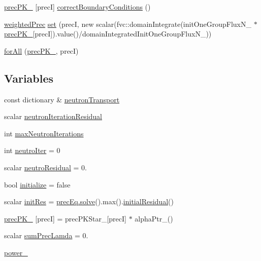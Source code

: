 \begin{DoxyCompactItemize}
\item 
\hyperlink{solvePointKineticsLiquidFuel_8H_a4fbb9f930fffeb8b5c6f88d6d76407f8}{prec\+P\+K\+\_\+} \mbox{[}precI\mbox{]} \hyperlink{solvePointKineticsLiquidFuel_8H_afa9c32a1343c6757096c085e4e03779d}{correct\+Boundary\+Conditions} ()
\item 
\hyperlink{solvePointKineticsLiquidFuel_8H_a056af3c483d96d8b3afe03e52ad0ed8b}{weighted\+Prec} \hyperlink{solvePointKineticsLiquidFuel_8H_ad5aac0954594169676a922d4bd3dbf07}{set} (precI, new scalar(fvc\+::domain\+Integrate(init\+One\+Group\+Flux\+N\+\_\+ $\ast$\hyperlink{solvePointKineticsLiquidFuel_8H_a4fbb9f930fffeb8b5c6f88d6d76407f8}{prec\+P\+K\+\_\+}\mbox{[}precI\mbox{]}).value()/domain\+Integrated\+Init\+One\+Group\+Flux\+N\+\_\+))
\item 
\hyperlink{solvePointKineticsLiquidFuel_8H_a71ece860e941703d6353746b23d10e24}{for\+All} (\hyperlink{solvePointKineticsLiquidFuel_8H_a4fbb9f930fffeb8b5c6f88d6d76407f8}{prec\+P\+K\+\_\+}, precI)
\end{DoxyCompactItemize}
\subsection*{Variables}
\begin{DoxyCompactItemize}
\item 
const dictionary \& \hyperlink{solvePointKineticsLiquidFuel_8H_ac82f3800c6fe7f00c65fbf04d3c1050d}{neutron\+Transport}
\item 
scalar \hyperlink{solvePointKineticsLiquidFuel_8H_a868e32a0d29170b5c556eabe69917730}{neutron\+Iteration\+Residual}
\item 
int \hyperlink{solvePointKineticsLiquidFuel_8H_aeeb27a033c3d21cdfe4cc47565bc21a2}{max\+Neutron\+Iterations}
\item 
int \hyperlink{solvePointKineticsLiquidFuel_8H_aaccb2b7dfd16dab02e52710265a05476}{neutro\+Iter} = 0
\item 
scalar \hyperlink{solvePointKineticsLiquidFuel_8H_aaf0ed550d3d8825b71bbeef77fd0387b}{neutro\+Residual} = 0.
\item 
bool \hyperlink{solvePointKineticsLiquidFuel_8H_a51d89a8c672e71d2091a843cdba679e6}{initialize} = false
\item 
scalar \hyperlink{solvePointKineticsLiquidFuel_8H_a4fd4e24ea0e4f3d5910106b6f78d94f5}{init\+Res} = \hyperlink{hEqn_8H_ac393846f32fcfca6facb8d23d493a8c5}{prec\+Eq.\+solve}().max().\hyperlink{solveThermalMechanics_8H_a008e5b0fbb46e38b919eee40fe082ac9}{initial\+Residual}()
\item 
\hyperlink{solvePointKineticsLiquidFuel_8H_a4fbb9f930fffeb8b5c6f88d6d76407f8}{prec\+P\+K\+\_\+} \mbox{[}precI\mbox{]} = prec\+P\+K\+Star\+\_\+\mbox{[}precI\mbox{]} $\ast$ alpha\+Ptr\+\_\+()
\item 
scalar \hyperlink{solvePointKineticsLiquidFuel_8H_a3b582448a7d1514d4715d10d5eab387e}{sum\+Prec\+Lamda} = 0.
\item 
\hyperlink{solvePointKineticsLiquidFuel_8H_a6db349ac2f1ddec3951d396b751c02a6}{power\+\_\+}
\end{DoxyCompactItemize}


